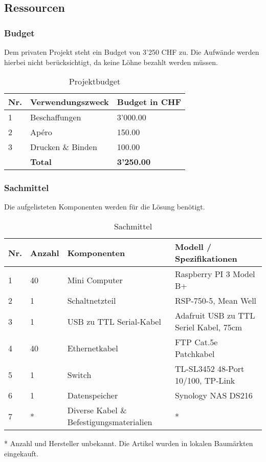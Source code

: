 \subsection{Ressourcen}

\subsubsection{Budget}
Dem privaten Projekt steht ein Budget von 3'250 CHF zu. Die Aufwände werden hierbei nicht berücksichtigt, da keine Löhne bezahlt werden müssen.
\begin{table}[H]
\centering
\begin{tabular}[t]{p{1cm}p{10cm}p{5cm}}
\hline
\rowcolor{heading}\textbf{Nr.} & \textbf{Verwendungszweck} &\hfill \textbf{Budget in CHF} \\\hline
1 & Beschaffungen & \hfill 3'000.00 \\\hline
2 & Apéro & \hfill 150.00 \\\hline
3 & Drucken \& Binden &\hfill 100.00 \\\hline
\textbf{} & \textbf{Total} &\hfill \textbf{3'250.00}  \\\hline
\end{tabular}
\caption{Projektbudget}
\end{table}

\subsubsection{Sachmittel}
Die aufgelisteten Komponenten werden für die Lösung benötigt.

\begin{table}[H]
\centering
\begin{tabular}[t]{p{1cm}p{1.2cm}p{6.9cm}p{6.9cm}}
\hline
\rowcolor{heading}\textbf{Nr.} & \textbf{Anzahl} & \textbf{Komponenten} & \textbf{Modell / Spezifikationen}\\\hline
1 & 40 & Mini Computer & Raspberry PI 3 Model B+\\\hline
2 & 1 & Schaltnetzteil & RSP-750-5, Mean Well\\\hline
3 & 1 & USB zu TTL Serial-Kabel & Adafruit USB zu TTL Seriel Kabel, 75cm \\\hline
4 & 40 & Ethernetkabel & FTP Cat.5e Patchkabel \\\hline
5 & 1 & Switch & TL-SL3452 48-Port 10/100, TP-Link \\\hline
6 & 1 & Datenspeicher & Synology NAS DS216\\\hline
7 & * & Diverse Kabel \& Befestigungsmaterialien & *\\\hline
\end{tabular}
\caption{Sachmittel}
\end{table}
* Anzahl und Hersteller unbekannt. Die Artikel wurden in lokalen Baumärkten eingekauft.